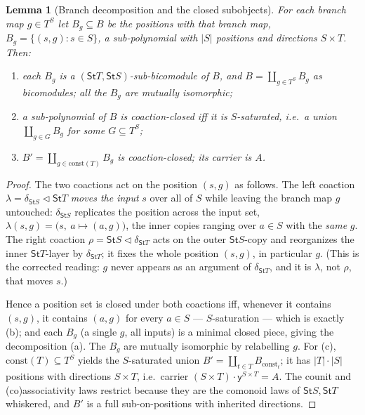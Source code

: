 \documentclass[11pt]{article}
\newcommand{\comp}{\mathbin{\triangleleft}}       %
\newcommand{\St}{\mathsf{St}}                      %
\newcommand{\y}{\mathsf{y}}
\newcommand{\const}{\mathrm{const}}
\theoremstyle{plain}
\newtheorem{lemma}{Lemma}
\theoremstyle{definition}
\theoremstyle{remark}
\begin{document}
\begin{lemma}[Branch decomposition and the closed subobjects]\label{lem:subbicomod}
For each branch map $g\in T^S$ let $B_g\subseteq B$ be the positions with that branch map,
$B_g=\{(s,g):s\in S\}$, a sub-polynomial with $|S|$ positions and directions $S\times T$.
Then:
\begin{enumerate}[label=\textup{(\alph*)},leftmargin=2em]
\item each $B_g$ is a $(\St T,\St S)$-sub-bicomodule of $B$, and
  $B=\coprod_{g\in T^S}B_g$ as bicomodules; all the $B_g$ are mutually isomorphic;
\item a sub-polynomial of $B$ is coaction-closed iff it is \emph{$S$-saturated}, i.e.\ a
  union $\coprod_{g\in G}B_g$ for some $G\subseteq T^S$;
\item $B'=\coprod_{g\in\const(T)}B_g$ is coaction-closed; its carrier is $A$.
\end{enumerate}
\end{lemma}

\begin{proof}
The two coactions act on the position $(s,g)$ as follows. The left coaction
$\lambda=\delta_{\St S}\comp\St T$ \emph{moves the input} $s$ over all of $S$ while leaving
the branch map $g$ untouched: $\delta_{\St S}$ replicates the position across the input set,
$\lambda(s,g)=\bigl(s,\ a\mapsto(a,g)\bigr)$, the inner copies ranging over $a\in S$ with
the \emph{same} $g$. The right coaction $\rho=\St S\comp\delta_{\St T}$ acts on the outer
$\St S$-copy and reorganizes the inner $\St T$-layer by $\delta_{\St T}$; it fixes the whole
position $(s,g)$, in particular $g$. (This is the corrected reading: $g$ never appears as an
argument of $\delta_{\St T}$, and it is $\lambda$, not $\rho$, that moves $s$.)

Hence a position set is closed under both coactions iff, whenever it contains $(s,g)$, it
contains $(a,g)$ for every $a\in S$ --- $S$-saturation --- which is exactly (b); and each
$B_g$ (a single $g$, all inputs) is a minimal closed piece, giving the decomposition (a).
The $B_g$ are mutually isomorphic by relabelling $g$. For (c), $\const(T)\subseteq T^S$
yields the $S$-saturated union $B'=\coprod_{t\in T}B_{\const_t}$; it has $|T|\cdot|S|$
positions with directions $S\times T$, i.e.\ carrier $(S\times T)\cdot\y^{S\times T}=A$. The
counit and (co)associativity laws restrict because they are the comonoid laws of
$\St S,\St T$ whiskered, and $B'$ is a full sub-on-positions with inherited directions.
\end{proof}
\end{document}
